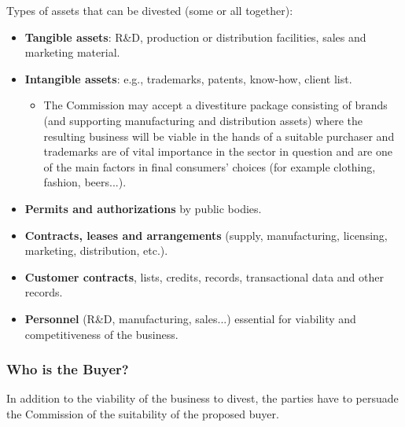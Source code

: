             Types of assets that can be divested (some or all together):
            \begin{itemize}
                \item \textbf{Tangible assets}: R\&D, production or distribution facilities, sales and marketing material.
                \item \textbf{Intangible assets}: e.g., trademarks, patents, know-how, client list.
                \begin{itemize}
                    \item The Commission may accept a divestiture package consisting of brands (and supporting manufacturing and distribution assets) where the resulting business will be viable in the hands of a suitable purchaser and trademarks are of vital importance in the sector in question and are one of the main factors in final consumers’ choices (for example clothing, fashion, beers...).
                \end{itemize}
                \item \textbf{Permits and authorizations} by public bodies.
                \item \textbf{Contracts, leases and arrangements} (supply, manufacturing, licensing, marketing, distribution, etc.).
                \item \textbf{Customer contracts}, lists, credits, records, transactional data and other records.
                \item \textbf{Personnel} (R\&D, manufacturing, sales...) essential for viability and competitiveness of the business.
            \end{itemize}

        \subsubsection{Who is the Buyer?}

        In addition to the viability of the business to divest, the parties have to persuade the Commission of the suitability of the proposed buyer.

